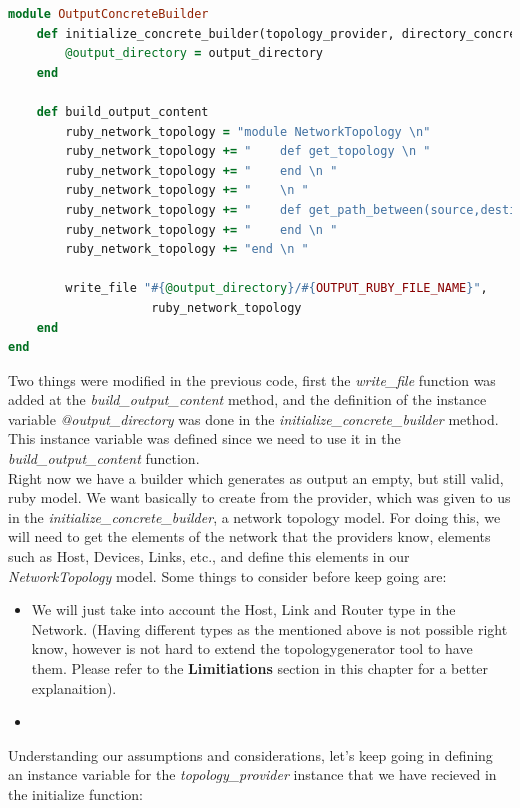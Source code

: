\begin{lstlisting}[language=Ruby,breaklines=true]
module OutputConcreteBuilder
	def initialize_concrete_builder(topology_provider, directory_concrete_builders, output_directory)
		@output_directory = output_directory
	end
    
    def build_output_content
    	ruby_network_topology = "module NetworkTopology \n"
    	ruby_network_topology += "    def get_topology \n "
    	ruby_network_topology += "    end \n "
    	ruby_network_topology += "    \n "
    	ruby_network_topology += "    def get_path_between(source,destination) \n "
    	ruby_network_topology += "    end \n "
    	ruby_network_topology += "end \n "
    	
    	write_file "#{@output_directory}/#{OUTPUT_RUBY_FILE_NAME}",
                    ruby_network_topology
    end
end
\end{lstlisting}

Two things were modified in the previous code, first the \textit{write\_file} function was added at the \textit{build\_output\_content} method, and the definition of the instance variable \textit{@output\_directory} was done in the \textit{initialize\_concrete\_builder} method. This instance variable was defined since we need to use it in the \textit{build\_output\_content} function. \\

Right now we have a builder which generates as output an empty, but still valid, ruby model. We want basically to create from the provider, which was given to us in the \textit{initialize\_concrete\_builder}, a network topology model. For doing this, we will need to get the elements of the network that the providers know, elements such as Host, Devices, Links, etc., and define this elements in our \textit{NetworkTopology} model. Some things to consider before keep going are: 
\begin{itemize}
\item We will just take into account the Host, Link and Router type in the Network. (Having different types as the mentioned above is not possible right know, however is not hard to extend the topologygenerator tool to have them. Please refer to the \textbf{Limitiations} section in this chapter for a better explanaition).
\item 
\end{itemize}

Understanding our assumptions and considerations, let's keep going in defining an instance variable for the \textit{topology\_provider} instance that we have recieved in the initialize function:

